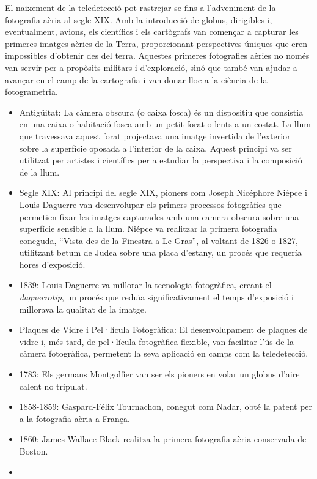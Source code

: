 \documentclass[
]{book}
\providecommand{\tightlist}{%
  \setlength{\itemsep}{0pt}\setlength{\parskip}{0pt}}
\begin{document}
El naixement de la teledetecció pot rastrejar-se fins a l'adveniment de la fotografia aèria al segle XIX. Amb la introducció de globus, dirigibles i, eventualment, avions, els científics i els cartògrafs van començar a capturar les primeres imatges aèries de la Terra, proporcionant perspectives úniques que eren impossibles d'obtenir des del terra. Aquestes primeres fotografies aèries no només van servir per a propòsits militars i d'exploració, sinó que també van ajudar a avançar en el camp de la cartografia i van donar lloc a la ciència de la fotogrametria.

\begin{itemize}
\tightlist
\item
  Antigüitat: La càmera obscura (o caixa fosca) és un dispositiu que consistia en una caixa o habitació fosca amb un petit forat o lents a un costat. La llum que travessava aquest forat projectava una imatge invertida de l'exterior sobre la superfície oposada a l'interior de la caixa. Aquest principi va ser utilitzat per artistes i científics per a estudiar la perspectiva i la composició de la llum.
\item
  Segle XIX: Al principi del segle XIX, pioners com Joseph Nicéphore Niépce i Louis Daguerre van desenvolupar els primers processos fotogràfics que permetien fixar les imatges capturades amb una camera obscura sobre una superfície sensible a la llum. Niépce va realitzar la primera fotografia coneguda, ``Vista des de la Finestra a Le Gras'', al voltant de 1826 o 1827, utilitzant betum de Judea sobre una placa d'estany, un procés que requería hores d'exposició.
\item
  1839: Louis Daguerre va millorar la tecnologia fotogràfica, creant el \emph{daguerrotip}, un procés que reduïa significativament el temps d'exposició i millorava la qualitat de la imatge.
\item
  Plaques de Vidre i Pel·lícula Fotogràfica: El desenvolupament de plaques de vidre i, més tard, de pel·lícula fotogràfica flexible, van facilitar l'ús de la càmera fotogràfica, permetent la seva aplicació en camps com la teledetecció.
\item
  1783: Els germans Montgolfier van ser els pioners en volar un globus d'aire calent no tripulat.
\item
  1858-1859: Gaspard-Félix Tournachon, conegut com Nadar, obté la patent per a la fotografia aèria a França.
\item
  1860: James Wallace Black realitza la primera fotografia aèria conservada de Boston.
\item

\end{itemize}
\end{document}
